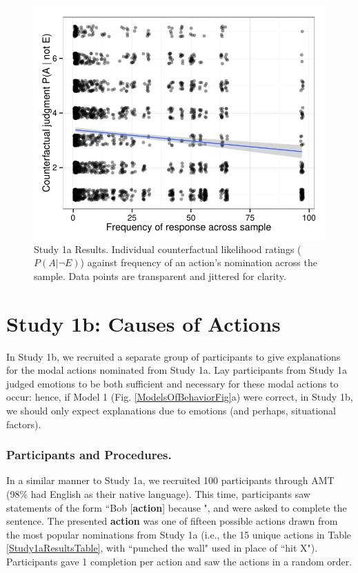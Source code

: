 \documentclass[10pt,letterpaper]{article}
\begin{document}
\begin{figure}[htb!]
\begin{center}
	\includegraphics[width=1\columnwidth]{images/study1a_results.pdf}
\end{center}
\caption{ Study 1a Results. Individual counterfactual likelihood ratings ($P(A | \neg E)$) against frequency of an action's nomination across the sample. Data points are transparent and jittered for clarity. }
\label{Study1aResultsFig}
\end{figure}


\section{Study 1b: Causes of Actions}

	In Study 1b, we recruited a separate group of participants to give explanations for the modal actions nominated from Study 1a. Lay participants from Study 1a judged emotions to be both sufficient and necessary for these modal actions to occur: hence, if Model 1 (Fig. \ref{ModelsOfBehaviorFig}a) were correct, in Study 1b, we should only expect explanations due to emotions (and perhaps, situational factors).


\subsubsection{Participants and Procedures.} 
In a similar manner to Study 1a, we recruited 100 participants through AMT (98\% had English as their native language). This time, participants saw statements of the form ``Bob [\textbf{action}] because \underline{\hspace{3em}}", and were asked to complete the sentence. The presented \textbf{action} was one of fifteen possible actions drawn from the most popular nominations from Study 1a (i.e., the 15 unique actions in Table \ref{Study1aResultsTable}, with ``punched the wall" used in place of ``hit X"). Participants gave 1 completion per action and saw the actions in a random order.
\end{document}
